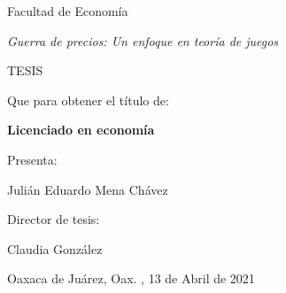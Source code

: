\documentclass[12pt]{book}
\begin{document}
\begin{titlepage}
\vspace{1cm}
\begin{minipage}[c]{3cm}
\hspace{.5cm}
\vrule width0.3mm height18cm
\hspace{0.07cm}
\vrule width1mm height18cm
\hspace{0.5cm}
\vrule width0.3mm height18cm
\hspace{0.07cm}
\vrule width1mm height18cm
\end{minipage}
\begin{minipage}[t]{11cm}
\begin{center}

\vspace{-9cm}

\huge Facultad de Economía

\vspace{1 cm}

\LARGE \textit{Guerra de precios: Un enfoque en teoría de juegos}

\vspace{1cm}

\huge TESIS

\vspace{.5cm}

\LARGE Que para obtener el título de:

\vspace{.5cm}

\textbf{\LARGE Licenciado en economía }

\vspace{.5cm}

\LARGE Presenta:

\vspace{.5cm}

\LARGE Julián Eduardo Mena Chávez

\vspace{1cm}

\LARGE Director de tesis:

\vspace{.5cm}

\LARGE Claudia González 

\vspace{1cm}

\large Oaxaca de Juárez, Oax. , 13 de Abril de 2021


\end{center}
\end{minipage}
\end{titlepage}
\newpage
$\ $
\thispagestyle{empty} %
\end{document}
